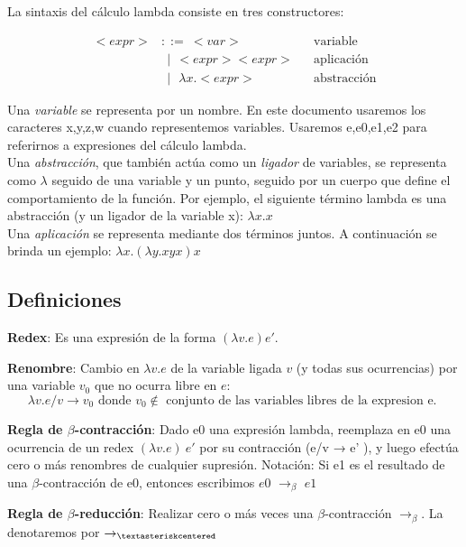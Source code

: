 \documentclass{article}
\begin{document}
La sintaxis del cálculo lambda consiste en tres constructores: 

\begin{align*}
<expr>& ::= \ <var> && \text{variable}\\
& \ \ |\ \ <expr><expr> && \text{aplicación}\\
& \ \ |\ \ \ \lambda x . <expr> && \text{abstracción}
\end{align*}

\vspace{12pt}
    Una \emph{variable} se representa por un nombre. En este documento usaremos los caracteres x,y,z,w cuando representemos variables. Usaremos e,e0,e1,e2 para referirnos a expresiones del cálculo lambda.\\
    
    Una \emph{abstracción}, que también actúa como un \emph{ligador} de variables, se representa como $\lambda$ seguido de una variable y un punto, seguido por un cuerpo que define el comportamiento de la función.  
Por ejemplo, el siguiente término lambda es una abstracción (y un ligador de la variable x): 
$\lambda x. x$ \\


    Una \emph{aplicación} se representa mediante dos términos juntos. A continuación se brinda un ejemplo: 
$\lambda x. (\lambda y. xyx) x$

\subsection{Definiciones}

\noindent\textbf{Redex}: Es una expresión de la forma $(\lambda v. e) e'$. \hfill \break

\noindent\textbf{Renombre}: Cambio en $\lambda v. e$ de la variable ligada $v$ (y todas sus ocurrencias) por una variable $v_0$ que no ocurra libre en $e$:
\[
\lambda v. e/v \rightarrow v_0 \text{ donde } v_0 \notin \text{ conjunto de las variables libres de la expresion e. }
\]

\noindent\textbf{Regla de $\beta$-contracción}:  Dado e0 una expresión lambda,  reemplaza en e0 una ocurrencia de un redex $(\lambda v. e)\ e'$ por su contracción (e/v → e’ ), y luego efectúa cero o más renombres de cualquier supresión.
Notación: Si e1 es el resultado de una $\beta$-contracción de e0, entonces
escribimos $e0$ $\rightarrow_{\beta}$ $e1$ \hfill \break

\noindent\textbf{Regla de $\beta$-reducción}: Realizar cero o más veces una $\beta$-contracción $\rightarrow_{\beta}$. La denotaremos por $\rightarrow_{\textasteriskcentered}$ \hfill \break
\end{document}
